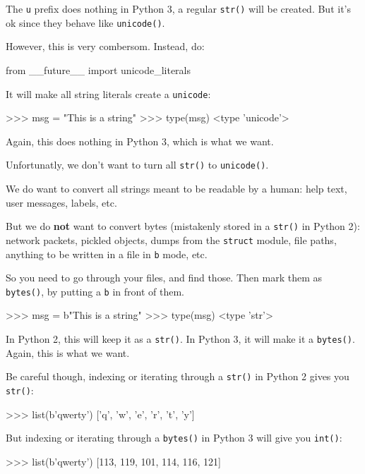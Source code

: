 The \lstinline{u} prefix does nothing in Python 3, a regular \lstinline{str()} will be created. But it's ok since they behave like \lstinline{unicode()}.

However, this is very combersom. Instead, do:

\begin{py2}
from __future__ import unicode_literals
\end{py2}

It will make all string literals create a \lstinline{unicode}:

\begin{py2}
>>> msg = "This is a string"
>>> type(msg)
<type 'unicode'>
\end{py2}

Again, this does nothing in Python 3, which is what we want.

Unfortunatly, we don't want to turn all \lstinline{str()} to \lstinline{unicode()}.

We do want to convert all strings meant to be readable by a human: help text, user messages, labels, etc.

But we do \textbf{not} want to convert bytes (mistakenly stored in a \lstinline{str()} in Python 2): network packets, pickled objects, dumps from the \lstinline{struct} module, file paths, anything to be written in a file in \lstinline{b} mode, etc.

So you need to go through your files, and find those. Then mark them as \lstinline{bytes()}, by putting a \lstinline{b} in front of them.

\begin{py2}
>>> msg = b"This is a string"
>>> type(msg)
<type 'str'>
\end{py2}

In Python 2, this will keep it as a \lstinline{str()}. In Python 3, it will make it a \lstinline{bytes()}. Again, this is what we want.

Be careful though, indexing or iterating through a \lstinline{str()} in Python 2 gives you \lstinline{str()}:

\begin{py2}
>>> list(b'qwerty')
['q', 'w', 'e', 'r', 't', 'y']
\end{py2}

But indexing or iterating through a \lstinline{bytes()} in Python 3 will give you \lstinline{int()}:

\begin{py2}
>>> list(b'qwerty')
[113, 119, 101, 114, 116, 121]
\end{py2}

